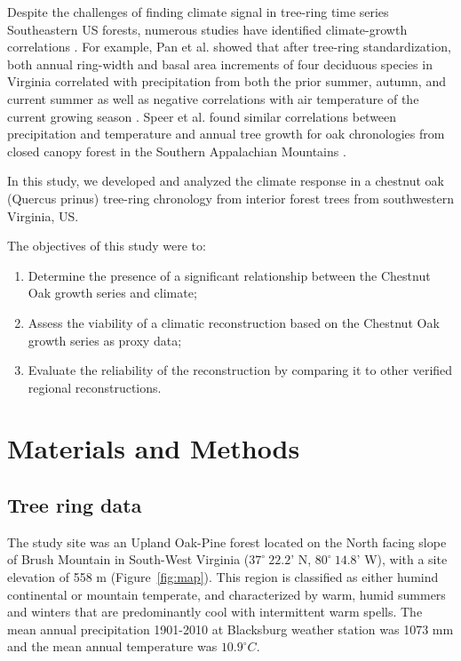 \documentclass[11pt]{article}
\begin{document}
Despite the challenges of finding climate signal in tree-ring time series Southeastern US forests, numerous studies have identified climate-growth correlations \cite{pan1997dendroclimatological, speer2009climate, rubino2000dendroclimatological}. For example, Pan et al. showed that after tree-ring standardization, both annual ring-width and basal area increments of four deciduous species in Virginia correlated with precipitation from both the prior summer, autumn, and current summer as well as negative correlations with air temperature of the current growing season \cite{pan1997dendroclimatological}. Speer et al. found similar correlations between precipitation and temperature and annual tree growth for oak chronologies from closed canopy forest in the Southern Appalachian Mountains \cite{speer2009climate}. 

In this study, we developed and analyzed the climate response in a chestnut oak (Quercus prinus) tree-ring chronology from interior forest trees from southwestern Virginia, US.


The objectives of this study were to:
\begin{enumerate}
  \item Determine the presence of a significant relationship between the Chestnut Oak growth series and climate;
  \item Assess the viability of a climatic reconstruction based on the Chestnut Oak growth series as proxy data;
  \item Evaluate the reliability of the reconstruction by comparing it to other verified regional reconstructions.  
\end{enumerate}

\section{Materials and Methods}
\label{sec:meth}

\subsection{Tree ring data}

The study site was an Upland Oak-Pine forest located on the North facing slope of Brush Mountain in South-West Virginia  ($37^{\circ} \ 22.2$' N, $80^{\circ}\ 14.8$' W), with a site elevation of 558 m (Figure~\ref{fig:map}). This region is classified as either humind continental or mountain temperate, and characterized by warm, humid summers and winters that are predominantly cool with intermittent warm spells. The mean annual precipitation 1901-2010 at Blacksburg weather station was 1073 mm and the mean annual temperature was $10.9^{\circ} C$. 
\end{document}
